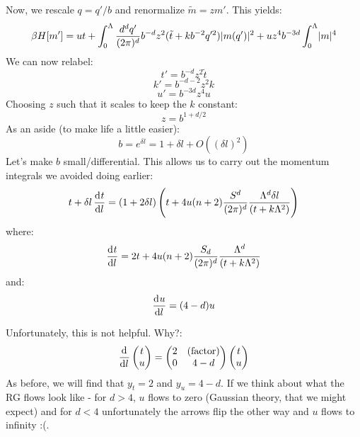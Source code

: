 Now, we rescale $q = q'/b$ and renormalize $\tilde{m} = zm'$. This yields:
\begin{equation}
    \beta H[m'] = ut + \int_0^\Lambda \frac{d^dq'}{(2\pi)^d}b^{-d}z^2(\tilde{t} + kb^{-2}q'^2)\lvert m(q') \rvert^2 + uz^4b^{-3d}\int_0^\Lambda \lvert m \rvert^4
\end{equation}
We can now relabel:
\begin{equation}
    t' = b^{-d}z^2\tilde{t}
\end{equation}
\begin{equation}
    k' = b^{-d-2}z^2k
\end{equation}
\begin{equation}
    u' = b^{-3d}z^4u
\end{equation}
Choosing $z$ such that it scales to keep the $k$ constant:
\begin{equation}
    z = b^{1+d/2}
\end{equation}
As an aside (to make life a little easier):
\begin{equation}
    b = e^{\delta l} = 1 + \delta l + O((\delta l)^2)
\end{equation}
Let's make $b$ small/differential. This allows us to carry out the momentum integrals we avoided doing earlier:
\begin{equation}
    t + \delta l \dod{t}{l} = (1 + 2\delta l)\left(t + 4u(n+2)\frac{S^d}{(2\pi)^d}\frac{\Lambda^d \delta l}{(t + k\Lambda^2)}\right)
\end{equation}
where:
\begin{equation}
    \dod{t}{l} = 2t + 4u(n+2)\frac{S_d}{(2\pi)^d}\frac{\Lambda^d}{(t + k\Lambda^2)}
\end{equation}
and:
\begin{equation}
    \dod{u}{l} = (4-d)u
\end{equation}

Unfortunately, this is not helpful. Why?:
\begin{equation}
    \dod{}{l}\m{t\\u} = \m{2 & \text{(factor)} \\ 0 & 4-d}\m{t \\ u}
\end{equation}
As before, we will find that $y_t = 2$ and $y_u = 4-d$. If we think about what the RG flows look like - for $d > 4$, $u$ flows to zero (Gaussian theory, that we might expect) and for $d < 4$ unfortunately the arrows flip the other way and $u$ flows to infinity :(. 

